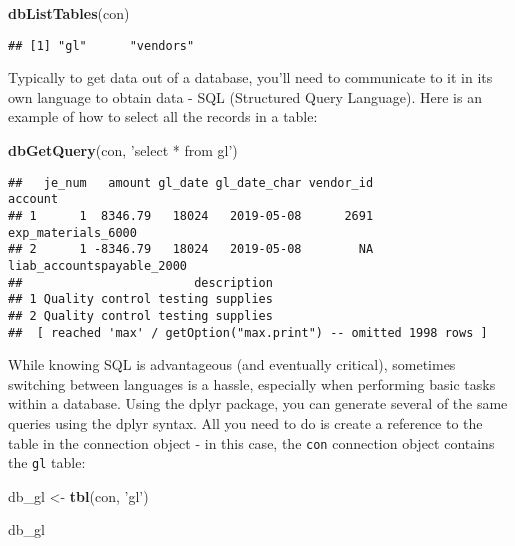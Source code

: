\documentclass[
]{book}
\newenvironment{Shaded}{\begin{snugshade}}{\end{snugshade}}
\newcommand{\KeywordTok}[1]{\textcolor[rgb]{0.13,0.29,0.53}{\textbf{#1}}}
\newcommand{\NormalTok}[1]{#1}
\newcommand{\StringTok}[1]{\textcolor[rgb]{0.31,0.60,0.02}{#1}}
\begin{document}
\begin{Shaded}
\begin{Highlighting}[]
\KeywordTok{dbListTables}\NormalTok{(con)}
\end{Highlighting}
\end{Shaded}

\begin{verbatim}
## [1] "gl"      "vendors"
\end{verbatim}

Typically to get data out of a database, you'll need to communicate to it in its own language to obtain data - SQL (Structured Query Language). Here is an example of how to select all the records in a table:

\begin{Shaded}
\begin{Highlighting}[]
\KeywordTok{dbGetQuery}\NormalTok{(con, }\StringTok{'select * from gl'}\NormalTok{)}
\end{Highlighting}
\end{Shaded}

\begin{verbatim}
##   je_num   amount gl_date gl_date_char vendor_id                   account
## 1      1  8346.79   18024   2019-05-08      2691        exp_materials_6000
## 2      1 -8346.79   18024   2019-05-08        NA liab_accountspayable_2000
##                        description
## 1 Quality control testing supplies
## 2 Quality control testing supplies
##  [ reached 'max' / getOption("max.print") -- omitted 1998 rows ]
\end{verbatim}

While knowing SQL is advantageous (and eventually critical), sometimes switching between languages is a hassle, especially when performing basic tasks within a database. Using the dplyr package, you can generate several of the same queries using the dplyr syntax. All you need to do is create a reference to the table in the connection object - in this case, the \texttt{con} connection object contains the \texttt{gl} table:

\begin{Shaded}
\begin{Highlighting}[]
\NormalTok{db_gl <-}\StringTok{ }\KeywordTok{tbl}\NormalTok{(con, }\StringTok{'gl'}\NormalTok{)}

\NormalTok{db_gl}
\end{Highlighting}
\end{Shaded}
\end{document}
